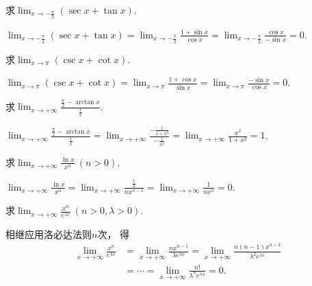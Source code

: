 \begin{example}
求\(\lim_{x\to-\frac\pi2} (\sec x+\tan x)\).
\begin{solution}
\(\lim_{x\to-\frac\pi2} (\sec x+\tan x)
= \lim_{x\to-\frac\pi2} \frac{1+\sin x}{\cos x}
= \lim_{x\to-\frac\pi2} \frac{\cos x}{-\sin x}
= 0\).
\end{solution}
\end{example}

\begin{example}
求\(\lim_{x\to\pi} (\csc x+\cot x)\).
\begin{solution}
\(\lim_{x\to\pi} (\csc x+\cot x)
= \lim_{x\to\pi} \frac{1+\cos x}{\sin x}
= \lim_{x\to\pi} \frac{-\sin x}{\cos x}
= 0\).
\end{solution}
\end{example}

\begin{example}
求\(\lim_{x\to+\infty} \frac{\frac{\pi}{2} - \arctan x}{\frac{1}{x}}\).
\begin{solution}
\(\lim_{x\to+\infty} \frac{\frac{\pi}{2} - \arctan x}{\frac{1}{x}}
= \lim_{x\to+\infty} \frac{-\frac{1}{1+x^2}}{-\frac{1}{x^2}}
= \lim_{x\to+\infty} \frac{x^2}{1+x^2} = 1\).
\end{solution}
\end{example}

\begin{example}
求\(\lim_{x\to+\infty} \frac{\ln x}{x^n}\ (n>0)\).
\begin{solution}
\(\lim_{x\to+\infty} \frac{\ln x}{x^n}
= \lim_{x\to+\infty} \frac{\frac{1}{x}}{n x^{n-1}}
= \lim_{x\to+\infty} \frac{1}{n x^n} = 0\).
\end{solution}
\end{example}

\begin{example}
求\(\lim_{x\to+\infty} \frac{x^n}{e^{\lambda x}}\ (n>0,\lambda>0)\).
\begin{solution}
相继应用洛必达法则\(n\)次，
得\begin{align*}
	\lim_{x\to+\infty} \frac{x^n}{e^{\lambda x}}
	&= \lim_{x\to+\infty} \frac{n x^{n-1}}{\lambda e^{\lambda x}}
	= \lim_{x\to+\infty} \frac{n(n-1) x^{n-2}}{\lambda^2 e^{\lambda x}} \\
	&= \dotsb = \lim_{x\to+\infty} \frac{n!}{\lambda^n e^{\lambda x}}
	= 0.
\end{align*}
\end{solution}
\end{example}

